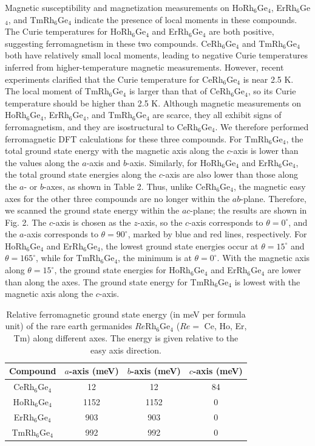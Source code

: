 \documentclass[preprint,12pt]{elsarticle}
\begin{document}
Magnetic susceptibility and magnetization measurements \cite{vosswinkel2013new} on HoRh$_6$Ge$_4$, ErRh$_6$Ge$_4$, and TmRh$_6$Ge$_4$ indicate the presence of local moments in these compounds. The Curie temperatures for HoRh$_6$Ge$_4$ and ErRh$_6$Ge$_4$ are both positive, suggesting ferromagnetism in these two compounds. CeRh$_6$Ge$_4$ and TmRh$_6$Ge$_4$ both have relatively small local moments, leading to negative Curie temperatures inferred from higher-temperature magnetic measurements. However, recent experiments clarified that the Curie temperature for CeRh$_6$Ge$_4$ is near 2.5 K. The local moment of TmRh$_6$Ge$_4$ is larger than that of CeRh$_6$Ge$_4$, so its Curie temperature should be higher than 2.5 K. Although magnetic measurements on HoRh$_6$Ge$_4$, ErRh$_6$Ge$_4$, and TmRh$_6$Ge$_4$ are scarce, they all exhibit signs of ferromagnetism, and they are isostructural to CeRh$_6$Ge$_4$. We therefore performed ferromagnetic DFT calculations for these three compounds. For TmRh$_6$Ge$_4$, the total ground state energy with the magnetic axis along the $c$-axis is lower than the values along the $a$-axis and $b$-axis. Similarly, for HoRh$_6$Ge$_4$ and ErRh$_6$Ge$_4$, the total ground state energies along the $c$-axis are also lower than those along the $a$- or $b$-axes, as shown in Table 2. Thus, unlike CeRh$_6$Ge$_4$, the magnetic easy axes for the other three compounds are no longer within the $ab$-plane. Therefore, we scanned the ground state energy within the $ac$-plane; the results are shown in Fig. 2. The $c$-axis is chosen as the $z$-axis, so the $c$-axis corresponds to $\theta = 0^\circ$, and the $a$-axis corresponds to $\theta = 90^\circ$, marked by blue and red lines, respectively. For HoRh$_6$Ge$_4$ and ErRh$_6$Ge$_4$, the lowest ground state energies occur at $\theta = 15^\circ$ and $\theta = 165^\circ$, while for TmRh$_6$Ge$_4$, the minimum is at $\theta = 0^\circ$. With the magnetic axis along $\theta = 15^\circ$, the ground state energies for HoRh$_6$Ge$_4$ and ErRh$_6$Ge$_4$ are lower than along the axes. The ground state energy for TmRh$_6$Ge$_4$ is lowest with the magnetic axis along the $c$-axis.

\begin{table}[h]
\caption{Relative ferromagnetic ground state energy (in meV per formula unit) of the rare earth germanides $Re$Rh$_6$Ge$_4$ ($Re =$ Ce, Ho, Er, Tm) along different axes. The energy is given relative to the easy axis direction.}
\label{tab:energy}
\begin{tabular}{c c c c}
\hline
Compound & $a$-axis (meV) & $b$-axis (meV) & $c$-axis (meV) \\
\hline
CeRh$_6$Ge$_4$ & 12 & 12 & 84 \\
HoRh$_6$Ge$_4$ & 1152 & 1152 & 0 \\
ErRh$_6$Ge$_4$ & 903 & 903 & 0 \\
TmRh$_6$Ge$_4$ & 992 & 992 & 0 \\
\hline
\end{tabular}
\end{table}
\end{document}
